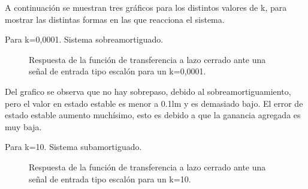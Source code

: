 \documentclass[a4paper,11pt]{article}
\begin{document}
 
A continuación se muestran tres gráficos para los distintos valores de k, para mostrar las distintas formas en las que reacciona el sistema.

Para k=0,0001. Sistema sobreamortiguado.

  \begin{figure}[H] %
	\caption{Respuesta de la función de transferencia a lazo cerrado ante una señal de entrada tipo escalón para un k=0,0001.}
	\label{fig:FTlazoc_k00001}
	\end{figure} 

Del grafico se observa que no hay sobrepaso, debido al sobreamortiguamiento, pero el valor en estado estable es menor a 0.1lm y es demasiado bajo. El error de estado estable aumento muchísimo, esto es debido a que la ganancia agregada es muy baja.

Para k=10. Sistema subamortiguado.

  \begin{figure}[H] %
	\caption{Respuesta de la función de transferencia a lazo cerrado ante una señal de entrada tipo escalón para un k=10.}
	\label{fig:FTlazoc_k10}
	\end{figure} 
\end{document}

